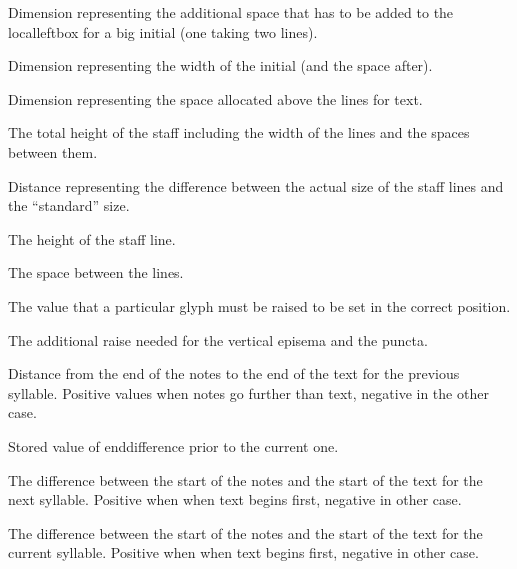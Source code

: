 Dimension representing the additional space that has to be added to
the localleftbox for a big initial (one taking two lines).

Dimension representing the width of the initial (and the space after).

Dimension representing the space allocated above the lines for text.	

The total height of the staff including the width of the lines and the spaces between them.

Distance representing the difference between the actual size of the staff lines and the ``standard'' size.

The height of the staff line.

The space between the lines.

The value that a particular glyph must be raised to be set in the correct position.

The additional raise needed for the vertical episema and the puncta.

Distance from the end of the notes to the end of the text for the previous syllable.  Positive values when notes go further than text, negative in the other case.

Stored value of enddifference prior to the current one.

The difference between the start of the notes and the start of the text for the next syllable.  Positive when when text begins first, negative in other case.

The difference between the start of the notes and the start of the text for the current syllable.  Positive when when text begins first, negative in other case.

